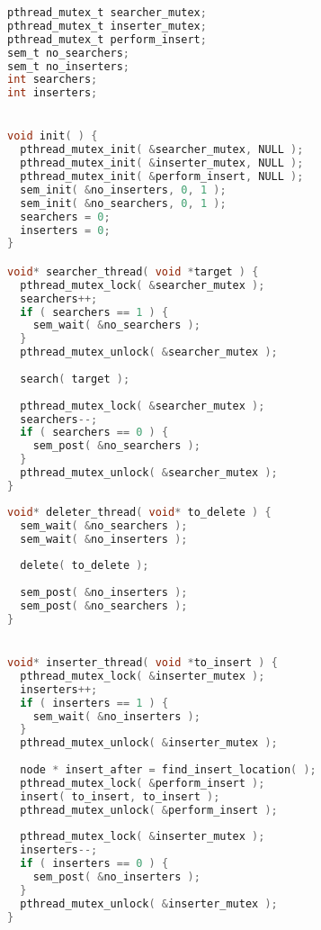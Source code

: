 {\scriptsize
\begin{multicols}{2}

\begin{lstlisting}[language=C]
pthread_mutex_t searcher_mutex;
pthread_mutex_t inserter_mutex;
pthread_mutex_t perform_insert;
sem_t no_searchers;
sem_t no_inserters;
int searchers;
int inserters;


void init( ) {
  pthread_mutex_init( &searcher_mutex, NULL );
  pthread_mutex_init( &inserter_mutex, NULL );
  pthread_mutex_init( &perform_insert, NULL );
  sem_init( &no_inserters, 0, 1 );
  sem_init( &no_searchers, 0, 1 );
  searchers = 0;
  inserters = 0;
}

void* searcher_thread( void *target ) {
  pthread_mutex_lock( &searcher_mutex );
  searchers++;
  if ( searchers == 1 ) {
    sem_wait( &no_searchers );
  }
  pthread_mutex_unlock( &searcher_mutex );
  
  search( target );
  
  pthread_mutex_lock( &searcher_mutex );
  searchers--;
  if ( searchers == 0 ) {
    sem_post( &no_searchers );
  }
  pthread_mutex_unlock( &searcher_mutex );
}
\end{lstlisting}
\columnbreak
\begin{lstlisting}[language=C]
void* deleter_thread( void* to_delete ) {
  sem_wait( &no_searchers );
  sem_wait( &no_inserters );
  
  delete( to_delete );
  
  sem_post( &no_inserters );
  sem_post( &no_searchers );
}


void* inserter_thread( void *to_insert ) {
  pthread_mutex_lock( &inserter_mutex );
  inserters++;
  if ( inserters == 1 ) {
    sem_wait( &no_inserters );
  }
  pthread_mutex_unlock( &inserter_mutex );
  
  node * insert_after = find_insert_location( );
  pthread_mutex_lock( &perform_insert );
  insert( to_insert, to_insert );
  pthread_mutex_unlock( &perform_insert );
  
  pthread_mutex_lock( &inserter_mutex );
  inserters--;
  if ( inserters == 0 ) {
    sem_post( &no_inserters );
  }
  pthread_mutex_unlock( &inserter_mutex );
}
\end{lstlisting}
\end{multicols}
}






